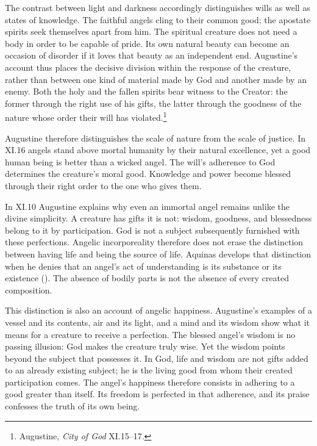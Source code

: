 The contrast between light and darkness accordingly distinguishes wills as well as states of knowledge. The faithful angels cling to their common good; the apostate spirits seek themselves apart from him. The spiritual creature does not need a body in order to be capable of pride. Its own natural beauty can become an occasion of disorder if it loves that beauty as an independent end. Augustine's account thus places the decisive division within the response of the creature, rather than between one kind of material made by God and another made by an enemy. Both the holy and the fallen spirits bear witness to the Creator: the former through the right use of his gifts, the latter through the goodness of the nature whose order their will has violated.\footnote{Augustine, \emph{City of God} XI.15--17.}

Augustine therefore distinguishes the scale of nature from the scale of justice. In XI.16 angels stand above mortal humanity by their natural excellence, yet a good human being is better than a wicked angel. The will's adherence to God determines the creature's moral good. Knowledge and power become blessed through their right order to the one who gives them.

In XI.10 Augustine explains why even an immortal angel remains unlike the divine simplicity. A creature has gifts it is not: wisdom, goodness, and blessedness belong to it by participation. God is not a subject subsequently furnished with these perfections. Angelic incorporeality therefore does not erase the distinction between having life and being the source of life. Aquinas develops that distinction when he denies that an angel's act of understanding is its substance or its existence (). The absence of bodily parts is not the absence of every created composition.


This distinction is also an account of angelic happiness. Augustine's examples of a vessel and its contents, air and its light, and a mind and its wisdom show what it means for a creature to receive a perfection. The blessed angel's wisdom is no passing illusion: God makes the creature truly wise. Yet the wisdom points beyond the subject that possesses it. In God, life and wisdom are not gifts added to an already existing subject; he is the living good from whom their created participation comes. The angel's happiness therefore consists in adhering to a good greater than itself. Its freedom is perfected in that adherence, and its praise confesses the truth of its own being.

